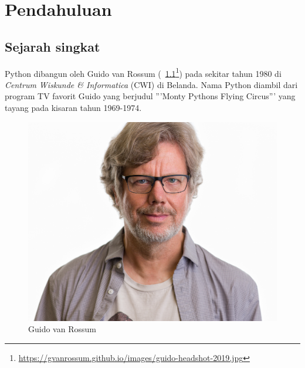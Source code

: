\chapter{Pendahuluan}
\section{Sejarah singkat}
Python dibangun oleh Guido van Rossum (\figurename~\ref{fig:guido}\footnote{\url{https://gvanrossum.github.io/images/guido-headshot-2019.jpg}}) pada sekitar tahun 1980 di \textit{Centrum Wiskunde \& Informatica} (CWI) di Belanda\cite{python3intro}. Nama Python diambil dari program TV favorit Guido yang berjudul '''Monty Pythons Flying Circus''' yang tayang pada kisaran tahun 1969-1974.

\begin{figure}
  \begin{center}
    \includegraphics[scale=.5]{pics/guido-headshot-2019.jpg}
    \caption{Guido van Rossum}
    \label{fig:guido}
  \end{center}
\end{figure}

